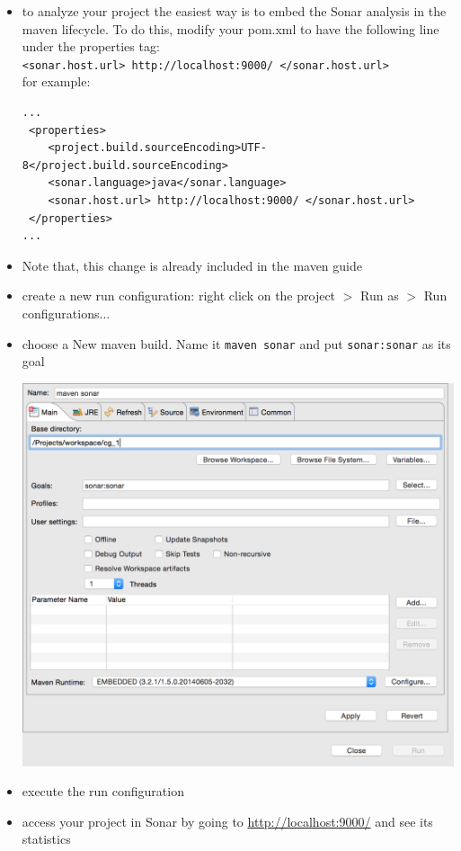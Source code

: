 \documentclass{article}
\newif\ifinstall
\begin{document}
\begin{itemize}
\ifinstall
\else
\item to analyze your project the easiest way is to embed the Sonar
  analysis in the maven lifecycle. To do this, modify your pom.xml to have the following line under
  the properties tag:\\
\texttt{<sonar.host.url> http://localhost:9000/ </sonar.host.url>}\\
for example:
\begin{lstlisting}
...
 <properties>
    <project.build.sourceEncoding>UTF-8</project.build.sourceEncoding>
    <sonar.language>java</sonar.language>
    <sonar.host.url> http://localhost:9000/ </sonar.host.url>
 </properties>
...
\end{lstlisting}
\item Note that, this change is already included in the maven guide
\item create a new run configuration: right click on the project $>$
  Run as $>$ Run configurations...
\item choose a New maven build. Name it \texttt{maven sonar} and put
  \texttt{sonar:sonar} as its goal
\begin{center}
\includegraphics[scale=0.5]{figures/ss5}
\end{center}
\item execute the run configuration
\item access your project in Sonar by going to
  \url{http://localhost:9000/} and see its statistics
\fi
\end{itemize}
\end{document}
